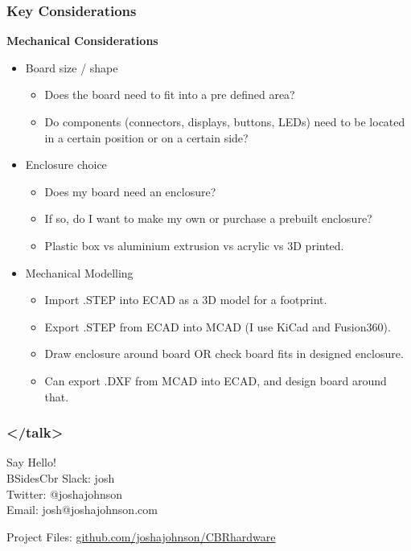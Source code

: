 \documentclass[t]{beamer}
\begin{document}
\begin{frame}
\frametitle{Key Considerations}
\large{\textbf{Mechanical Considerations}}
\vspace{1mm}
\begin{itemize}
	\item Board size / shape
	\begin{itemize}
		\item Does the board need to fit into a pre defined area?
		\item Do components (connectors, displays, buttons, LEDs) need to be located in a certain position or on a certain side?
	\end{itemize}
	\item Enclosure choice
	\begin{itemize}
		\item Does my board need an enclosure?
		\item If so, do I want to make my own or purchase a prebuilt enclosure?
		\item Plastic box vs aluminium extrusion vs acrylic vs 3D printed. 
	\end{itemize}
	\item Mechanical Modelling 
	\begin{itemize}
		\item Import .STEP into ECAD as a 3D model for a footprint.
		\item Export .STEP from ECAD into MCAD (I use KiCad and Fusion360).
		\item Draw enclosure around board OR check board fits in designed enclosure.
		\item Can export .DXF from MCAD into ECAD, and design board around that. 
	\end{itemize}
\end{itemize}
\end{frame}


\begin{frame}
\frametitle{</talk>}

Say Hello! \\
BSidesCbr Slack: josh\\
Twitter: @\textunderscore joshajohnson\\
Email: josh@joshajohnson.com\\
\vspace{4mm}

Project Files: \url{github.com/joshajohnson/CBRhardware}\\
\end{frame}
\end{document}
